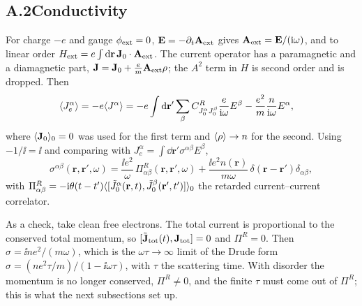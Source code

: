 \subsection*{A.2\quad Conductivity}
For charge $-e$ and gauge $\phi_{\rm ext}=0$, $\mathbf{E}=-\partial_t\mathbf{A}_{\rm ext}$ gives $\mathbf{A}_{\rm ext}=\mathbf{E}/(\mathrm{i}\omega)$, and to linear order $H_{\rm ext}=e\int\mathrm{d}\mathbf{r}\,\mathbf{J}_0\cdot\mathbf{A}_{\rm ext}$. The current operator has a paramagnetic and a diamagnetic part, $\mathbf{J}=\mathbf{J}_0+\frac em\mathbf{A}_{\rm ext}\rho$; the $A^2$ term in $H$ is second order and is dropped. Then
\begin{align}
\langle J_e^\alpha \rangle=-e\langle J^\alpha \rangle
&=-e\int\mathrm{d}\mathbf{r}'\sum_\beta C^R_{J_0^\alpha J_0^\beta}\frac{e}{\mathrm{i}\omega}E^\beta-\frac{e^2}{m}\frac{n}{\mathrm{i}\omega}E^\alpha ,
\end{align}
where $\langle \mathbf{J}_0 \rangle_0=0$ was used for the first term and $\langle \rho \rangle\to n$ for the second. Using $-1/\ii=\ii$ and comparing with $J_e^\alpha=\int\dd\mathbf{r}'\sigma^{\alpha\beta}E^\beta$,
\begin{equation}
\boxed{\sigma^{\alpha\beta}(\mathbf{r},\mathbf{r}',\omega)=\frac{\ii e^2}{\omega}\,\Pi^R_{\alpha\beta}(\mathbf{r},\mathbf{r}',\omega)+\frac{\ii e^2n(\mathbf{r})}{m\omega}\,\delta(\mathbf{r}-\mathbf{r}')\delta_{\alpha\beta}},
\label{eq:Ksigma}
\end{equation}
with $\Pi^R_{\alpha\beta}=-\mathrm{i}\theta(t-t')\langle [\tilde J_0^\alpha(\mathbf{r},t),\tilde J_0^\beta(\mathbf{r}',t')] \rangle_0$ the retarded current--current correlator.

As a check, take clean free electrons. The total current is proportional to the conserved total momentum, so $[\tilde{\mathbf{J}}_{\rm tot}(t),\mathbf{J}_{\rm tot}]=0$ and $\Pi^R=0$. Then $\sigma=\ii ne^2/(m\omega)$, which is the $\omega\tau\to\infty$ limit of the Drude form $\sigma=(ne^2\tau/m)/(1-\ii\omega\tau)$, with $\tau$ the scattering time. With disorder the momentum is no longer conserved, $\Pi^R\neq0$, and the finite $\tau$ must come out of $\Pi^R$; this is what the next subsections set up.

